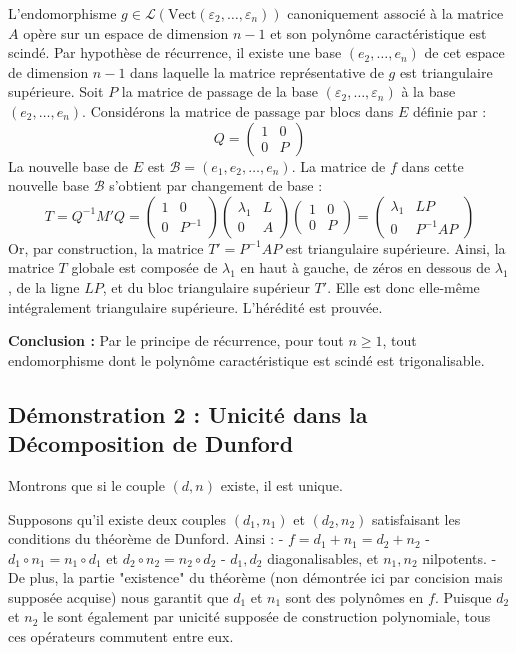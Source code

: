 \documentclass[11pt,a4paper]{article}
\begin{document}
L'endomorphisme $g \in \mathcal{L}(\text{Vect}(\varepsilon_2, \ldots, \varepsilon_n))$ canoniquement associé à la matrice $A$ opère sur un espace de dimension $n-1$ et son polynôme caractéristique est scindé.
Par hypothèse de récurrence, il existe une base $(e_2, \ldots, e_n)$ de cet espace de dimension $n-1$ dans laquelle la matrice représentative de $g$ est triangulaire supérieure.
Soit $P$ la matrice de passage de la base $(\varepsilon_2, \ldots, \varepsilon_n)$ à la base $(e_2, \ldots, e_n)$.
Considérons la matrice de passage par blocs dans $E$ définie par :
$$ Q = \begin{pmatrix} 1 & 0 \\ 0 & P \end{pmatrix} $$
La nouvelle base de $E$ est $\mathcal{B} = (e_1, e_2, \ldots, e_n)$.
La matrice de $f$ dans cette nouvelle base $\mathcal{B}$ s'obtient par changement de base :
$$ T = Q^{-1} M' Q = \begin{pmatrix} 1 & 0 \\ 0 & P^{-1} \end{pmatrix} \begin{pmatrix} \lambda_1 & L \\ 0 & A \end{pmatrix} \begin{pmatrix} 1 & 0 \\ 0 & P \end{pmatrix} = \begin{pmatrix} \lambda_1 & L P \\ 0 & P^{-1} A P \end{pmatrix} $$
Or, par construction, la matrice $T' = P^{-1} A P$ est triangulaire supérieure.
Ainsi, la matrice $T$ globale est composée de $\lambda_1$ en haut à gauche, de zéros en dessous de $\lambda_1$, de la ligne $L P$, et du bloc triangulaire supérieur $T'$. Elle est donc elle-même intégralement triangulaire supérieure.
L'hérédité est prouvée.

\textbf{Conclusion :}
Par le principe de récurrence, pour tout $n \geq 1$, tout endomorphisme dont le polynôme caractéristique est scindé est trigonalisable.

\subsection{Démonstration 2 : Unicité dans la Décomposition de Dunford}

Montrons que si le couple $(d, n)$ existe, il est unique.

Supposons qu'il existe deux couples $(d_1, n_1)$ et $(d_2, n_2)$ satisfaisant les conditions du théorème de Dunford.
Ainsi :
- $f = d_1 + n_1 = d_2 + n_2$
- $d_1 \circ n_1 = n_1 \circ d_1$ et $d_2 \circ n_2 = n_2 \circ d_2$
- $d_1, d_2$ diagonalisables, et $n_1, n_2$ nilpotents.
- De plus, la partie "existence" du théorème (non démontrée ici par concision mais supposée acquise) nous garantit que $d_1$ et $n_1$ sont des polynômes en $f$. Puisque $d_2$ et $n_2$ le sont également par unicité supposée de construction polynomiale, tous ces opérateurs commutent entre eux.
\end{document}
